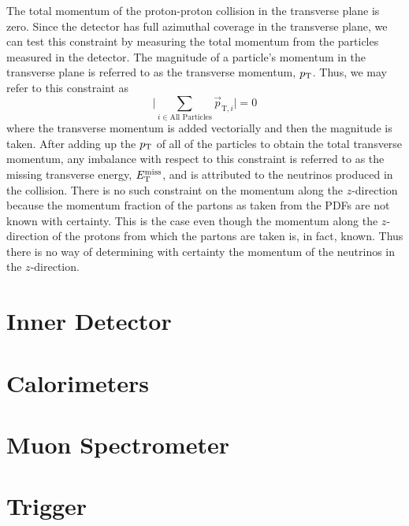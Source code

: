 The total momentum of the proton-proton collision in the transverse
plane is zero. Since the detector has full azimuthal coverage 
in the transverse plane, we can test this constraint by measuring
the total momentum from the particles measured in the detector.
The magnitude of a particle's momentum 
in the transverse plane is referred to as the 
transverse momentum, $p_{\mathrm{T}}$.
Thus, we may refer to this constraint as
\begin{equation}
\Bigg| \sum_{i\in\textrm{All Particles}} \vec{p}_{\textrm{T},i} \Bigg| = 0
\end{equation}
where the transverse momentum is added vectorially and then
the magnitude is taken.
After adding up the $p_{\mathrm{T}}$ of all of the particles to obtain
the total transverse momentum, 
any imbalance with respect to this constraint
is referred to as the
missing transverse energy, $E_{\mathrm{T}}^{\mathrm{miss}}$, and is attributed to the 
neutrinos produced in the collision. 
There is no such constraint on the momentum along the $z$-direction
because the momentum fraction of the partons as taken
from the PDFs are not known with certainty. This is the case
even though the momentum along the $z$-direction of the 
protons from which the partons are taken is, in fact, known.
Thus there is no way of determining with certainty the 
momentum of the neutrinos in the $z$-direction.



\section{Inner Detector}
\label{sec:atlas_id}
\section{Calorimeters }
\section{Muon Spectrometer}
\section{Trigger}

